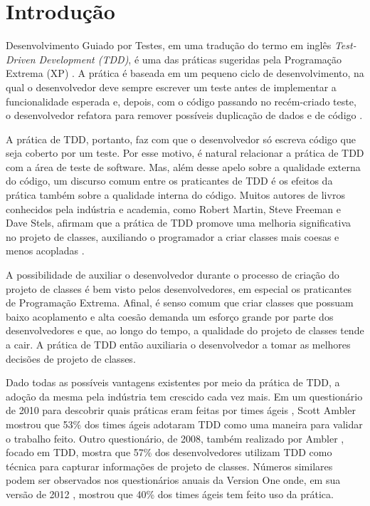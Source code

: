 \chapter{Introdução}
\label{cap:introducao}

Desenvolvimento Guiado por Testes, em uma tradução do termo
em inglês \textit{Test-Driven Development (TDD)},
é uma das práticas sugeridas pela Programação
Extrema (XP) \cite{XPExplained}. A prática é baseada em um pequeno ciclo de
desenvolvimento, na qual o desenvolvedor deve sempre escrever um teste antes
de implementar a funcionalidade esperada e, depois, com o código
passando no recém-criado teste, o desenvolvedor refatora para 
remover possíveis duplicação de dados e de código \cite{TDDByExample}.

A prática de TDD, portanto, faz com que o desenvolvedor só escreva código
que seja coberto por um teste. Por esse motivo, é natural relacionar a prática
de TDD com a área de teste de software. Mas, além desse apelo sobre
a qualidade externa do código, um discurso comum entre os praticantes de TDD
é os efeitos da prática também sobre a qualidade interna do código.
Muitos autores de livros conhecidos pela indústria e academia, como
Robert Martin, Steve Freeman e Dave Stels, afirmam que a prática de TDD
promove uma melhoria significativa no projeto de classes, auxiliando
o programador a criar classes mais coesas e menos acopladas 
\cite{TDDByExample} \cite{GOOS} \cite{astels-tdd}.

A possibilidade de auxiliar o desenvolvedor durante o processo de criação
do projeto de classes é bem visto pelos desenvolvedores, em especial
os praticantes de Programação Extrema. Afinal, é senso comum que
criar classes que possuam baixo acoplamento e alta coesão demanda
um esforço grande por parte dos desenvolvedores e que, ao longo do tempo,
a qualidade do projeto de classes tende a cair. A prática de TDD então
auxiliaria o desenvolvedor a tomar as melhores decisões de projeto
de classes.

Dado todas as possíveis vantagens existentes por meio da prática de TDD,
a adoção da mesma pela indústria tem crescido cada vez mais. 
Em um questionário de 2010 para descobrir quais práticas eram feitas por times
ágeis \cite{wambler-survey-agile}, Scott Ambler mostrou que 53\% dos times ágeis
adotaram TDD como uma maneira para validar o trabalho feito.
Outro questionário, de 2008, também realizado por Ambler
\cite{wambler-survey-tdd}, focado em TDD, mostra que 57\% dos desenvolvedores 
utilizam TDD como técnica para capturar informações de projeto de classes.
Números similares podem ser observados nos questionários anuais da Version One onde,
em sua versão de 2012 \cite{versionone-2012}, mostrou que 40\% dos times ágeis tem feito uso da prática.

